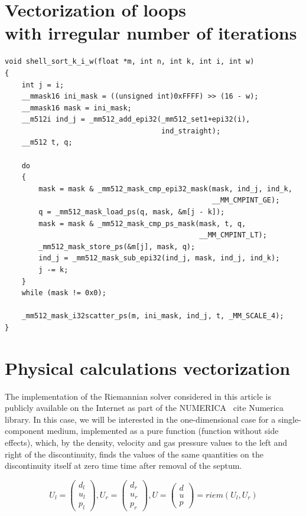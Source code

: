 \documentclass[
11pt,%
tightenlines,%
twoside,%
onecolumn,%
nofloats,%
nobibnotes,%
nofootinbib,%
superscriptaddress,%
noshowpacs,%
centertags]%
{revtex4}
\begin{document}
\section{Vectorization of loops \protect\\
with irregular number of iterations}

\begin{lstlisting}
void shell_sort_k_i_w(float *m, int n, int k, int i, int w)
{
    int j = i;
    __mmask16 ini_mask = ((unsigned int)0xFFFF) >> (16 - w);
    __mmask16 mask = ini_mask;
    __m512i ind_j = _mm512_add_epi32(_mm512_set1+epi32(i),
                                     ind_straight);
    __m512 t, q;

    do
    {
        mask = mask & _mm512_mask_cmp_epi32_mask(mask, ind_j, ind_k,
                                                 __MM_CMPINT_GE);
        q = _mm512_mask_load_ps(q, mask, &m[j - k]);
        mask = mask & _mm512_mask_cmp_ps_mask(mask, t, q,
                                              __MM_CMPINT_LT);
        _mm512_mask_store_ps(&m[j], mask, q);
        ind_j = _mm512_mask_sub_epi32(ind_j, mask, ind_j, ind_k);
        j -= k;
    }
    while (mask != 0x0);
    
    _mm512_mask_i32scatter_ps(m, ini_mask, ind_j, t, _MM_SCALE_4);
}
\end{lstlisting}

\section{Physical calculations vectorization}

The implementation of the Riemannian solver considered in this article is publicly available on the Internet as part of the NUMERICA \ cite {Numerica} library. In this case, we will be interested in the one-dimensional case for a single-component medium, implemented as a pure function (function without side effects), which, by the density, velocity and gas pressure values to the left and right of the discontinuity, finds the values of the same quantities on the discontinuity itself at zero time time after removal of the septum.

\begin{equation}\label{eq:riemann}
U_l = \left( \begin{array}{ccc} d_l \\ u_l \\ p_l \end{array} \right),
U_r = \left( \begin{array}{ccc} d_r \\ u_r \\ p_r \end{array} \right),
U = \left( \begin{array}{ccc} d \\ u \\ p \end{array} \right) = riem(U_l, U_r)
\end{equation}
\end{document}
